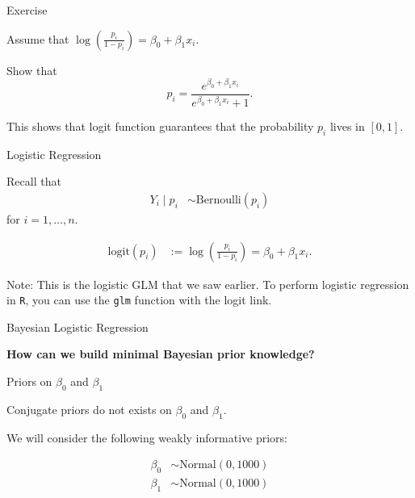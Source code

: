 \documentclass[
  ignorenonframetext,
]{beamer}
\begin{document}
\begin{frame}{Exercise}
\protect\hypertarget{exercise}{}

Assume that \(\log(\frac{p_i}{1-p_i}) = \beta_0 + \beta_1x_i.\)

Show that
\[p_i = \frac{e^{\beta_0 + \beta_1x_i}}{e^{\beta_0 + \beta_1x_i} + 1}.\]

This shows that logit function guarantees that the probability \(p_i\)
lives in \([0,1].\)

\end{frame}

\begin{frame}{Logistic Regression}
\protect\hypertarget{logistic-regression-1}{}

Recall that \begin{align}
Y_i \mid p_i &\sim \text{Bernoulli}(p_i)
\end{align} for \(i=1,\ldots,n.\)

\begin{align}
\text{logit}(p_i)  &:= \log(\frac{p_i}{1-p_i}) = \beta_0 + \beta_1x_i.
\end{align}

Note: This is the logistic GLM that we saw earlier. To perform logistic
regression in \texttt{R}, you can use the \texttt{glm} function with the
logit link.

\end{frame}

\begin{frame}{Bayesian Logistic Regression}
\protect\hypertarget{bayesian-logistic-regression}{}

\textbf{How can we build minimal Bayesian prior knowledge?}

\end{frame}

\begin{frame}{Priors on \(\beta_0\) and \(\beta_1\)}
\protect\hypertarget{priors-on-beta_0-and-beta_1}{}

Conjugate priors do not exists on \(\beta_0\) and \(\beta_1.\)

We will consider the following weakly informative priors:

\begin{align}
\beta_0 &\sim \text{Normal}(0,1000) \\
\beta_1 &\sim \text{Normal}(0,1000) \\
\end{align}

\end{frame}
\end{document}
